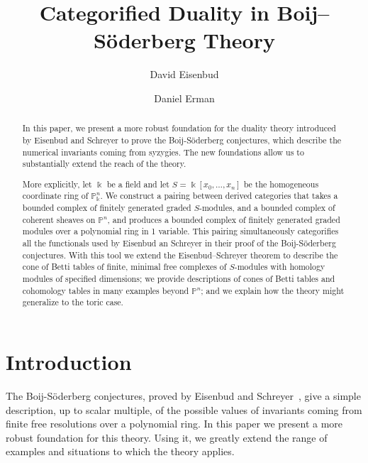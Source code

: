 \documentclass[12pt]{amsart}
\title{Categorified Duality in Boij--S\"oderberg Theory}
\author{David Eisenbud}
\author{Daniel Erman}\thanks{The first author was partially supported by an NSF grant, and the second author was partially supported by an NSF fellowship and by a Simons Foundation fellowship.}
\theoremstyle{definition}
\theoremstyle{remark}
\newcommand{\kk}{\Bbbk}
\newcommand{\PP}{\mathbb{P}}
\renewcommand{\P}{{\mathbb P}}
\begin{document}
\begin{abstract} In this paper, we present a more robust foundation for the duality theory introduced by Eisenbud and Schreyer to prove the Boij-S\"oderberg conjectures, which describe the numerical invariants coming from syzygies. The new foundations allow us to substantially extend the reach of the theory.

More explicitly, let $\kk$ be a field and let $S = \kk[x_{0}, \dots,x_{n}]$ be the homogeneous coordinate ring of $\PP^{n}_{\kk}$.
We construct a pairing between derived categories that takes a bounded complex of
finitely generated graded $S$-modules,  and a bounded complex of coherent sheaves on $\P^{n}$, and produces a bounded complex of finitely generated graded modules over a polynomial ring in 1 variable. This pairing simultaneously categorifies all the functionals used by Eisenbud an Schreyer in their proof of the Boij-S\"oderberg conjectures. With this tool we extend the Eisenbud--Schreyer theorem to describe the cone of Betti tables of finite, minimal free complexes of $S$-modules with homology modules of specified dimensions;  we provide descriptions of cones of Betti tables and cohomology tables in many examples beyond $\PP^n$; and we explain how the theory might generalize to the toric case.
\end{abstract}

\maketitle

\tableofcontents


\section*{Introduction}
The Boij-S\"oderberg conjectures, proved by Eisenbud and Schreyer~\cite{eis-schrey1}, give a simple description, up to scalar multiple, of the possible values of invariants coming from finite free resolutions over a polynomial ring. In this paper we present a more robust foundation for this theory. Using it, we greatly extend the range of examples and situations to which the theory applies.
\end{document}
